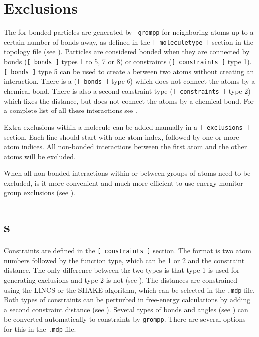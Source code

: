 \section{Exclusions}
\label{sec:excl}
The  for bonded particles are generated by {\tt
grompp} for neighboring atoms up to a certain number of bonds away, as
defined in the {\tt [~moleculetype~]} section in the topology file
(see ). Particles are considered bonded when they are
connected by bonds ({\tt [~bonds~]} types 1 to 5, 7 or 8) or constraints
({\tt [~constraints~]} type 1).
{\tt[~bonds~]} type 5 can be used to create a 
between two atoms without creating an interaction.
There is a 
({\tt[~bonds~]} type 6) which does not connect the atoms by a chemical bond.
There is also a second constraint type ({\tt[~constraints~]} type 2)
which fixes the distance, but does not connect
the atoms by a chemical bond.
For a complete list of all these interactions see .

Extra exclusions within a molecule can be added manually
in a {\tt [~exclusions~]} section. Each line should start with one
atom index, followed by one or more atom indices. All non-bonded
interactions between the first atom and the other atoms will be excluded.

When all non-bonded interactions within or between groups of atoms need
to be excluded, is it more convenient and much more efficient to use
energy monitor group exclusions (see ).

\section{s}
\label{sec:constraints}
Constraints are defined in the {\tt [~constraints~]} section.
The format is two atom numbers followed by the function type,
which can be 1 or 2 and the constraint distance.
The only difference between the two types is that type 1 is used
for generating exclusions and type 2 is not (see ).
The distances are constrained using the LINCS or the SHAKE algorithm,
which can be selected in the {\tt *.mdp} file.
Both types of constraints can be perturbed in free-energy calculations
by adding a second constraint distance (see ).
Several types of bonds and angles (see ) can
be converted automatically to constraints by {\tt grompp}.
There are several options for this in the {\tt *.mdp} file.

